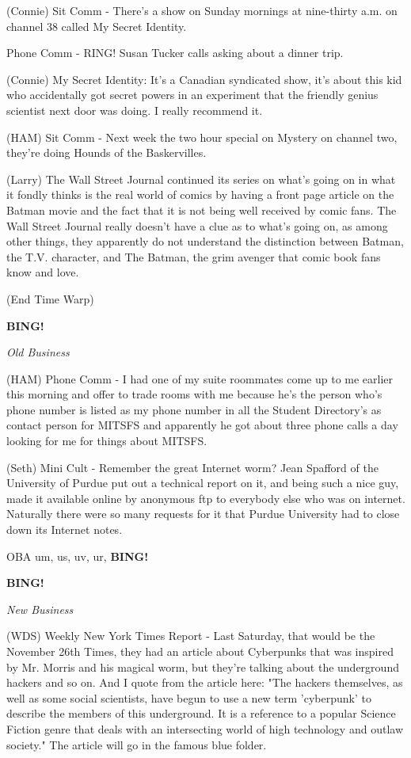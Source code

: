 \documentclass[12pt]{article}
\newcommand{\bing}{{\bf BING!} }
\newcommand{\goto}[1]{\bing \vskip 12pt \centerline{{\em{#1}}}}
\begin{document}
(Connie) Sit Comm - There's a show on Sunday mornings at nine-thirty a.m. on channel 38 called My Secret Identity.

Phone Comm - RING! Susan Tucker calls asking about a dinner trip.

(Connie) My Secret Identity: It's a Canadian syndicated show, it's about this kid who accidentally got secret powers in an experiment that the friendly genius scientist next door was doing.  I really recommend it.

(HAM) Sit Comm - Next week the two hour special on Mystery on channel two, they're doing Hounds of the Baskervilles.

(Larry) The Wall Street Journal continued its series on what's going on in what it fondly thinks is the real world of comics by having a front page article on the Batman movie and the fact that it is not being well received by comic fans.  The Wall Street Journal really doesn't have a clue as to what's going on, as among other things, they apparently do not understand the distinction between Batman, the T.V. character, and The Batman, the grim avenger that comic book fans know and love.

(End Time Warp)

\goto{Old Business}

(HAM) Phone Comm - I had one of my suite roommates come up to me earlier this morning and offer to trade rooms with me because he's the person who's phone number is listed as my phone number in all the Student Directory's as contact person for MITSFS and apparently he got about three phone calls a day looking for me for things about MITSFS.

(Seth) Mini Cult - Remember the great Internet worm? Jean Spafford of the University of Purdue put out a technical report on it, and being such a nice guy, made it available online by anonymous ftp to everybody else who was on internet.  Naturally there were so many requests for it that Purdue University had to close down its Internet notes. 

OBA um, us, uv, ur, \bing

\goto{New Business}

(WDS) Weekly New York Times Report - Last Saturday, that would be the November 26th Times, they had an article about Cyberpunks that was inspired by Mr. Morris and his magical worm, but they're talking about the underground hackers and so on. And I quote from the article here: "The hackers themselves, as well as some social scientists, have begun to use a new term 'cyberpunk' to describe the members of this underground. It is a reference to a popular Science Fiction genre that deals with an intersecting world of high technology and outlaw society." The article will go in the famous blue folder.
\end{document}
